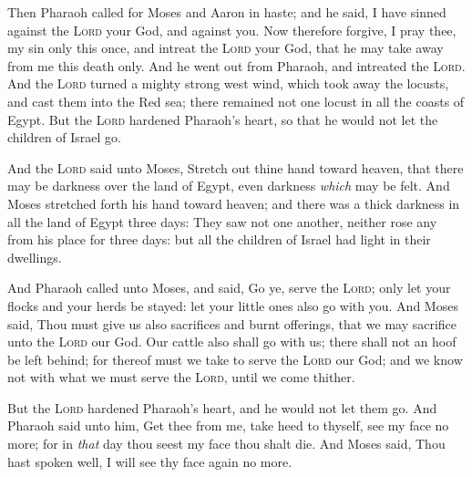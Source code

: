 \documentclass[11pt,letterpaper,oneside]{memoir}
\begin{document}
Then Pharaoh called for Moses and Aaron in haste; and he said, I have
sinned against the \textsc{Lord} your God, and against you. Now
therefore forgive, I pray thee, my sin only this once, and intreat the
\textsc{Lord} your God, that he may take away from me this death only.
And he went out from Pharaoh, and intreated the \textsc{Lord}. And the
\textsc{Lord} turned a mighty strong west wind, which took away the
locusts, and cast them into the Red sea; there remained not one locust
in all the coasts of Egypt. But the \textsc{Lord} hardened Pharaoh's
heart, so that he would not let the children of Israel go.

And the \textsc{Lord} said unto Moses, Stretch out thine hand toward
heaven, that there may be darkness over the land of Egypt, even darkness
\emph{which} may be felt. And Moses stretched forth his hand toward
heaven; and there was a thick darkness in all the land of Egypt three
days: They saw not one another, neither rose any from his place for
three days: but all the children of Israel had light in their dwellings.

And Pharaoh called unto Moses, and said, Go ye, serve the \textsc{Lord};
only let your flocks and your herds be stayed: let your little ones also
go with you. And Moses said, Thou must give us also sacrifices and burnt
offerings, that we may sacrifice unto the \textsc{Lord} our God. Our
cattle also shall go with us; there shall not an hoof be left behind;
for thereof must we take to serve the \textsc{Lord} our God; and we know
not with what we must serve the \textsc{Lord}, until we come thither.

But the \textsc{Lord} hardened Pharaoh's heart, and he would not let
them go. And Pharaoh said unto him, Get thee from me, take heed to
thyself, see my face no more; for in \emph{that} day thou seest my face
thou shalt die. And Moses said, Thou hast spoken well, I will see thy
face again no more.
\end{document}
